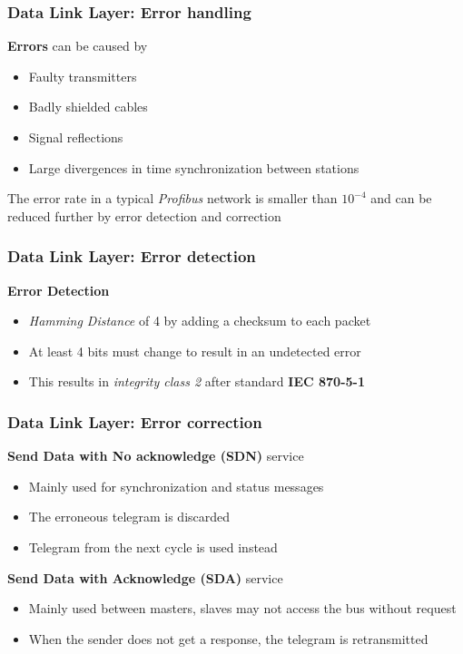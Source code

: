 \documentclass{beamer}
\begin{document}
\begin{frame}
  \frametitle{Data Link Layer: Error handling}
  \textbf{Errors} can be caused by
  \begin{itemize}
    \item Faulty transmitters
    \item Badly shielded cables
    \item Signal reflections
    \item Large divergences in time synchronization between stations
  \end{itemize}
  \vspace{10pt}
  The error rate in a typical \textit{Profibus} network is smaller than $10^{-4}$ and can
  be reduced further by error detection and correction
\end{frame}

\begin{frame}
  \frametitle{Data Link Layer: Error detection}
  \textbf{Error Detection}
  \begin{itemize}
    \item \textit{Hamming Distance} of 4 by adding a checksum to each packet
    \item At least 4 bits must change to result in an undetected error
    \item This results in \textit{integrity class 2} after standard \textbf{IEC 870-5-1}
  \end{itemize}
\end{frame}

\begin{frame}
  \frametitle{Data Link Layer: Error correction}
  \textbf{Send Data with No acknowledge (SDN)} service
  \begin{itemize}
    \item Mainly used for synchronization and status messages
    \item The erroneous telegram is discarded
    \item Telegram from the next cycle is used instead
  \end{itemize}

  \vspace{10pt}
  \textbf{Send Data with Acknowledge (SDA)} service
  \begin{itemize}
    \item Mainly used between masters, slaves may not access the bus without request
    \item When the sender does not get a response, the telegram is retransmitted
  \end{itemize}
\end{frame}
\end{document}
